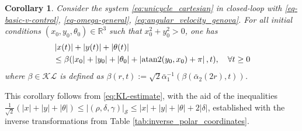 \documentclass[journal,twoside,web]{ieeecolor}
\newtheorem{corollary}{Corollary}
\theoremstyle{definition}
\newcommand{\abs}[1]{\left\lvert#1\right\rvert}
\begin{document}
\begin{corollary}
\label{cor-attractivity}
\textit Consider the system 
\eqref{eq:unicycle_cartesian} in closed-loop with \eqref{eq-basic-v-control}, \eqref{eq-omega-general},  \eqref{eq:angular_velocity_genova}.
For all initial conditions $(x_0,y_0,\theta_0)\in\mathbb{R}^3$ such that $x_0^2 + y_0^2>0$, one has 
\begin{align*}
&\abs{x(t)} + \abs{y(t)} + \abs{\theta(t)}\nonumber\\
&\le  {\beta}(\abs{x_0} + \abs{y_0} + \abs{\theta_0}  + \abs{{\rm atan2}(y_0,x_0) + \pi},t), \quad \forall t \ge 0 \label{eq:KL-estimate_xytheta}
\end{align*}
where $\beta\in\mathcal{KL}$  is defined as  $\beta(r,t) := \sqrt{2}\bar{\alpha}_1^{-1}(\beta( \bar{\alpha}_2(2 r),t))$.
\end{corollary}

This corollary follows from \eqref{eq:KL-estimate}, with the aid of the inequalities 
$\frac{1}{\sqrt{2}} (\abs{x} + \abs{y} + \abs{\theta}) \le \abs{(\rho,\delta,\gamma)}_{\mathcal{S}} \le \abs{x} + \abs{y} + \abs{\theta}  + 2\abs{\delta}$,  established with the inverse transformations from Table \ref{tab:inverse_polar_coordinates}.
\end{document}

